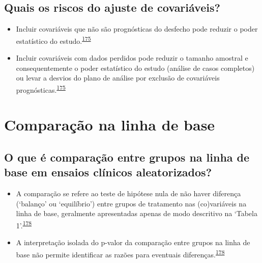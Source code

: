 \documentclass[
  a4paper,
]{book}
\begin{document}
\hypertarget{quais-os-riscos-do-ajuste-de-covariuxe1veis}{%
\subsection{Quais os riscos do ajuste de covariáveis?}\label{quais-os-riscos-do-ajuste-de-covariuxe1veis}}

\begin{itemize}
\item
  Incluir covariáveis que não são prognósticas do desfecho pode reduzir o poder estatístico do estudo.\textsuperscript{\protect\hyperlink{ref-Kahan2014}{175}}
\item
  Incluir covariáveis com dados perdidos pode reduzir o tamanho amostral e consequentemente o poder estatístico do estudo (análise de casos completos) ou levar a desvios do plano de análise por exclusão de covariáveis prognósticas.\textsuperscript{\protect\hyperlink{ref-Kahan2014}{175}}
\end{itemize}

\hypertarget{comparacao-linha-de-base}{%
\section{Comparação na linha de base}\label{comparacao-linha-de-base}}

\hypertarget{o-que-uxe9-comparauxe7uxe3o-entre-grupos-na-linha-de-base-em-ensaios-cluxednicos-aleatorizados}{%
\subsection{O que é comparação entre grupos na linha de base em ensaios clínicos aleatorizados?}\label{o-que-uxe9-comparauxe7uxe3o-entre-grupos-na-linha-de-base-em-ensaios-cluxednicos-aleatorizados}}

\begin{itemize}
\item
  A comparação se refere ao teste de hipótese nula de não haver diferença (`balanço' ou `equilíbrio') entre grupos de tratamento nas (co)variáveis na linha de base, geralmente apresentadas apenas de modo descritivo na `Tabela 1'.\textsuperscript{\protect\hyperlink{ref-Stang2018}{178}}
\item
  A interpretação isolada do p-valor da comparação entre grupos na linha de base não permite identificar as razões para eventuais diferenças.\textsuperscript{\protect\hyperlink{ref-Stang2018}{178}}
\end{itemize}
\end{document}

